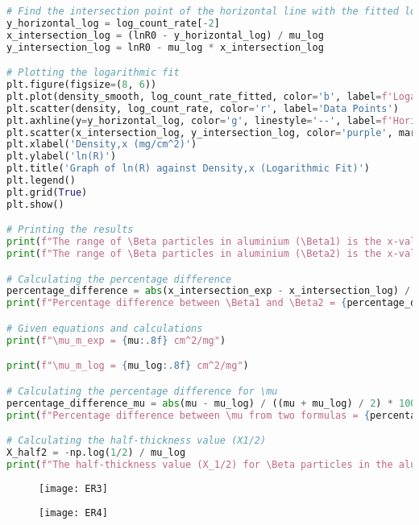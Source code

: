 \documentclass[a4paper,11pt]{article}
\begin{document}
\begin{lstlisting}[language=Python]
# Find the intersection point of the horizontal line with the fitted log curve
y_horizontal_log = log_count_rate[-2]
x_intersection_log = (lnR0 - y_horizontal_log) / mu_log
y_intersection_log = lnR0 - mu_log * x_intersection_log

# Plotting the logarithmic fit
plt.figure(figsize=(8, 6))
plt.plot(density_smooth, log_count_rate_fitted, color='b', label=f'Logarithmic Fit\nln(R) = {lnR0:.3f} - {mu_log:.5f}x')
plt.scatter(density, log_count_rate, color='r', label='Data Points')
plt.axhline(y=y_horizontal_log, color='g', linestyle='--', label=f'Horizontal Line at y = {y_horizontal_log:.3f}')
plt.scatter(x_intersection_log, y_intersection_log, color='purple', marker='X', label=f'Intersection Point (X): ({x_intersection_log:.2f}, {y_intersection_log:.2f})')
plt.xlabel('Density,x (mg/cm^2)')
plt.ylabel('ln(R)')
plt.title('Graph of ln(R) against Density,x (Logarithmic Fit)')
plt.legend()
plt.grid(True)
plt.show()

# Printing the results
print(f"The range of \Beta particles in aluminium (\Beta1) is the x-value of intersection points of first graph: {x_intersection_exp:.2f} mg/cm^2")
print(f"The range of \Beta particles in aluminium (\Beta2) is the x-value of intersection points of second graph: {x_intersection_log:.2f} mg/cm^2")

# Calculating the percentage difference
percentage_difference = abs(x_intersection_exp - x_intersection_log) / ((x_intersection_exp + x_intersection_log) / 2) * 100
print(f"Percentage difference between \Beta1 and \Beta2 = {percentage_difference:.2f} %")

# Given equations and calculations
print(f"\mu_m_exp = {mu:.8f} cm^2/mg")

print(f"\mu_m_log = {mu_log:.8f} cm^2/mg")

# Calculating the percentage difference for \mu
percentage_difference_mu = abs(mu - mu_log) / ((mu + mu_log) / 2) * 100
print(f"Percentage difference between \mu from two formulas = {percentage_difference_mu:.2f} %")

# Calculating the half-thickness value (X1/2)
X_half2 = -np.log(1/2) / mu_log
print(f"The half-thickness value (X_1/2) for \Beta particles in the aluminium absorber (\Beta2) is {X_half2:.2f} mg/cm^2")
\end{lstlisting}
\begin{figure}[h!]
\centering
    \texttt{[image: ER3]}
    \label{fig:setupC}
\end{figure}
\begin{figure}[h!]
\centering
    \texttt{[image: ER4]}
    \label{fig:setupC}
\end{figure}
\end{document}
